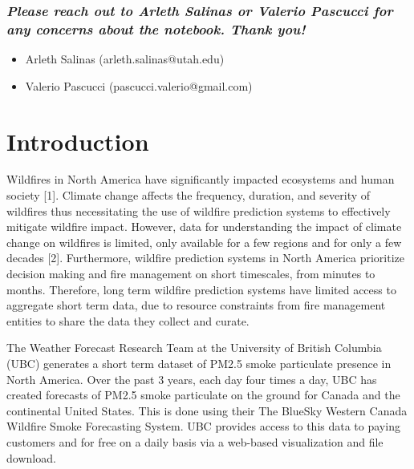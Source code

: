 \documentclass[
  letterpaper,
  DIV=11,
  numbers=noendperiod]{scrreprt}
\providecommand{\tightlist}{%
  \setlength{\itemsep}{0pt}\setlength{\parskip}{0pt}}\usepackage{longtable,booktabs,array}
\begin{document}
\subsection{\texorpdfstring{\emph{Please reach out to Arleth Salinas or
Valerio Pascucci for any concerns about the notebook. Thank
you!}}{Please reach out to Arleth Salinas or Valerio Pascucci for any concerns about the notebook. Thank you!}}\label{please-reach-out-to-arleth-salinas-or-valerio-pascucci-for-any-concerns-about-the-notebook.-thank-you}

\begin{itemize}
\tightlist
\item
  Arleth Salinas (arleth.salinas@utah.edu)
\item
  Valerio Pascucci (pascucci.valerio@gmail.com)
\end{itemize}


\chapter{Introduction}\label{sec-introduction}

Wildfires in North America have significantly impacted ecosystems and
human society {[}1{]}. Climate change affects the frequency, duration,
and severity of wildfires thus necessitating the use of wildfire
prediction systems to effectively mitigate wildfire impact. However,
data for understanding the impact of climate change on wildfires is
limited, only available for a few regions and for only a few decades
{[}2{]}. Furthermore, wildfire prediction systems in North America
prioritize decision making and fire management on short timescales, from
minutes to months. Therefore, long term wildfire prediction systems have
limited access to aggregate short term data, due to resource constraints
from fire management entities to share the data they collect and curate.

The Weather Forecast Research Team at the University of British Columbia
(UBC) generates a short term dataset of PM2.5 smoke particulate presence
in North America. Over the past 3 years, each day four times a day, UBC
has created forecasts of PM2.5 smoke particulate on the ground for
Canada and the continental United States. This is done using their The
BlueSky Western Canada Wildfire Smoke Forecasting System. UBC provides
access to this data to paying customers and for free on a daily basis
via a web-based visualization and file download.
\end{document}

